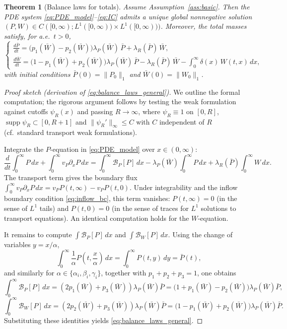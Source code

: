 \documentclass[pdflatex,sn-mathphys-ay]{sn-jnl}
\theoremstyle{thmstyleone}
\newtheorem{theorem}{Theorem}[section]
\theoremstyle{definition}
\theoremstyle{remark}
\begin{document}
\begin{theorem}[Balance laws for totals]
\label{thm:balance-laws}
Assume Assumption~\ref{ass:basic}. Then the PDE system \eqref{eq:PDE_model}--\eqref{eq:IC}
admits a unique global nonnegative solution
$(P,W)\in C([0,\infty);L^1([0,\infty))\times L^1([0,\infty)))$.
Moreover, the total masses satisfy, for a.e.\ $t>0$,
\begin{equation}\label{eq:balance_laws_general}
\begin{cases}
\displaystyle
\frac{d\bar P}{dt}
=\Big(p_1(\bar W)-p_2(\bar W)\Big)\lambda_P(\bar W)\,\bar P
+\lambda_R(\bar P)\,\bar W,\\[8pt]
\displaystyle
\frac{d\bar W}{dt}
=\Big(1-p_1(\bar W)+p_2(\bar W)\Big)\lambda_P(\bar W)\,\bar P
-\lambda_R(\bar P)\,\bar W
-\int_0^\infty \delta(x)\,W(t,x)\,dx,
\end{cases}
\end{equation}
with initial conditions $\bar P(0)=\|P_0\|_{1}$ and $\bar W(0)=\|W_0\|_{1}$.
\end{theorem}

\begin{proof}[Proof sketch (derivation of \eqref{eq:balance_laws_general})]
We outline the formal computation; the rigorous argument follows by testing the weak formulation
against cutoffs $\psi_R(x)$ and passing $R\to\infty$, where $\psi_R \equiv 1$ on $[0,R]$, $\operatorname{supp} \psi_R \subset [0,R+1]$ and $\lVert\psi_R' \rVert_{\infty}\le C$ with $C$ independent of $R$ (cf.\ standard transport weak formulations).

Integrate the $P$-equation in \eqref{eq:PDE_model} over $x\in(0,\infty)$:
\[
\frac{d}{dt}\int_0^\infty P\,dx
+\int_0^\infty v_P\partial_x P\,dx
=\int_0^\infty \mathcal B_P[P]\,dx
-\lambda_P(\bar W)\int_0^\infty P\,dx
+\lambda_R(\bar P)\int_0^\infty W\,dx.
\]
The transport term gives the boundary flux
$\int_0^\infty v_P\partial_x P\,dx = v_P P(t,\infty)-v_P P(t,0)$.
Under integrability and the inflow boundary condition \eqref{eq:inflow_bc}, this term vanishes:
$P(t,\infty)=0$ (in the sense of $L^1$ tails) and $P(t,0)=0$ (in the sense of traces for $L^1$ solutions to transport equations).
An identical computation holds for the $W$-equation.

It remains to compute $\int \mathcal B_P[P]\,dx$ and $\int \mathcal B_W[P]\,dx$.
Using the change of variables $y=x/\alpha$,
\[
\int_0^\infty \frac{1}{\alpha}P\!\left(t,\frac{x}{\alpha}\right)\,dx
=\int_0^\infty P(t,y)\,dy=\bar P(t),
\]
and similarly for $\alpha\in\{\alpha_i,\beta_i,\gamma_i\}$, together with $p_1+p_2+p_3=1$,
one obtains
\[
\int_0^\infty \mathcal B_P[P]\,dx=(2p_1(\bar W)+p_3(\bar W))\lambda_P(\bar W)\bar P
=\big(1+p_1(\bar W)-p_2(\bar W)\big)\lambda_P(\bar W)\bar P,
\]
\[
\int_0^\infty \mathcal B_W[P]\,dx=(2p_2(\bar W)+p_3(\bar W))\lambda_P(\bar W)\bar P
=\big(1-p_1(\bar W)+p_2(\bar W)\big)\lambda_P(\bar W)\bar P.
\]
Substituting these identities yields \eqref{eq:balance_laws_general}.
\end{proof}
\end{document}
